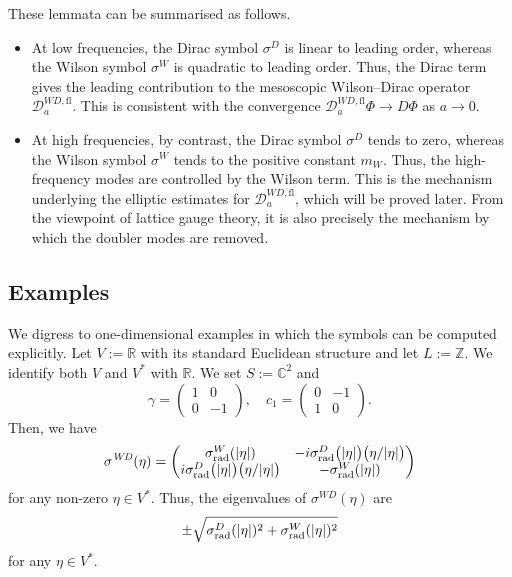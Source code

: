 \documentclass[a4paper,oneside,12pt]{amsart}
\theoremstyle{plain}
\theoremstyle{definition}
\theoremstyle{remark}
\newcommand{\Z}{\mathbb{Z}}
\newcommand{\R}{\mathbb{R}}
\newcommand{\C}{\mathbb{C}}
\DeclarePairedDelimiter{\abs}{\lvert}{\rvert}
\newcommand{\Lattice}{L}
\newcommand{\symbolDirac}{\sigma^D}
\newcommand{\symbolWilson}{\sigma^W}
\newcommand{\symbolWilsonDirac}{\sigma^{\mathit{WD}}}
\newcommand{\radialsymbolDirac}{\symbolDirac_{\mathrm{rad}}}
\newcommand{\radialsymbolWilson}{\symbolWilson_{\mathrm{rad}}}
\newcommand{\flatmesoscopicWilsonDiracoperator}[1][a]{\mathcal{D}_{#1}^{\mathit{WD},\mathrm{fl}}}
\begin{document}
These lemmata can be summarised as follows.
\begin{itemize}
  \item
    At low frequencies, the Dirac symbol $\symbolDirac$ is linear to leading order, whereas the Wilson symbol $\symbolWilson$ is quadratic to leading order.
    Thus, the Dirac term gives the leading contribution to the mesoscopic Wilson--Dirac operator $\flatmesoscopicWilsonDiracoperator$.
    This is consistent with the convergence $\flatmesoscopicWilsonDiracoperator \Phi \to D\Phi$ as $a \to 0$.
  \item
    At high frequencies, by contrast, the Dirac symbol $\symbolDirac$ tends to zero, whereas the Wilson symbol $\symbolWilson$ tends to the positive constant $m_W$.
    Thus, the high-frequency modes are controlled by the Wilson term.
    This is the mechanism underlying the elliptic estimates for $\flatmesoscopicWilsonDiracoperator$, which will be proved later.
    From the viewpoint of lattice gauge theory, it is also precisely the mechanism by which the doubler modes are removed.
\end{itemize}

\subsection{Examples}

We digress to one-dimensional examples in which the symbols can be computed explicitly.
Let $V := \R$ with its standard Euclidean structure and let $\Lattice := \Z$.
We identify both $V$ and $V^*$ with $\R$.
We set $S := \C^2$ and
\begin{equation}
  \gamma = \begin{pmatrix}1 & 0 \\ 0 & -1\end{pmatrix}, \quad c_1 = \begin{pmatrix}0 & -1 \\ 1 & 0\end{pmatrix}.
\end{equation}
Then, we have
\begin{equation}
  \symbolWilsonDirac(\eta) = \begin{pmatrix}
    \radialsymbolWilson(\abs{\eta}) & -i\radialsymbolDirac\big(\abs{\eta}\big) \big(\eta/\abs{\eta}\big) \\
    i\radialsymbolDirac\big(\abs{\eta}\big) \big(\eta/\abs{\eta}\big) & -\radialsymbolWilson(\abs{\eta})
  \end{pmatrix}
\end{equation}
for any non-zero $\eta \in V^*$.
Thus, the eigenvalues of $\symbolWilsonDirac(\eta)$ are
\begin{equation}
  \pm \sqrt{\radialsymbolDirac(\abs{\eta})^2 + \radialsymbolWilson(\abs{\eta})^2}
\end{equation}
for any $\eta \in V^*$.
\end{document}
